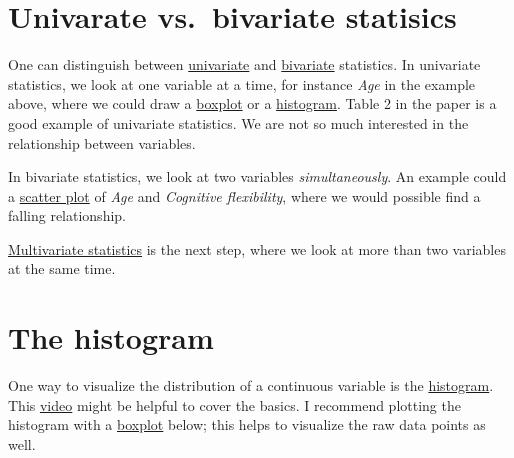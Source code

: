 \documentclass[
]{book}
\begin{document}
\section{Univarate vs.~bivariate statisics}\label{univarate-vs.-bivariate-statisics}

One can distinguish between \href{https://en.wikipedia.org/wiki/Univariate_analysis}{univariate} and \href{https://en.wikipedia.org/wiki/Bivariate_analysis}{bivariate} statistics.
In univariate statistics, we look at one variable at a time, for instance \emph{Age} in the example above,
where we could draw a \href{https://en.wikipedia.org/wiki/Box_plot}{boxplot} or a \href{https://en.wikipedia.org/wiki/Histogram}{histogram}.
Table 2 in the paper is a good example of univariate statistics. We are not so much interested in the relationship between variables.

In bivariate statistics, we look at two variables \emph{simultaneously}.
An example could a \href{https://en.wikipedia.org/wiki/Scatter_plot}{scatter plot} of \emph{Age} and \emph{Cognitive flexibility},
where we would possible find a falling relationship.

\href{https://en.wikipedia.org/wiki/Multivariate_statistics}{Multivariate statistics} is the next step, where we look at more than two variables at the same time.

\section{The histogram}\label{the-histogram}

One way to visualize the distribution of a continuous variable is the \href{https://en.wikipedia.org/wiki/Histogram}{histogram}.
This \href{https://www.youtube.com/watch?v=gSEYtAjuZ-Y&ab_channel=KhanAcademy}{video} might be helpful to cover the basics.
I recommend plotting the histogram with a \href{https://en.wikipedia.org/wiki/Box_plot}{boxplot} below; this helps
to visualize the raw data points as well.
\end{document}
